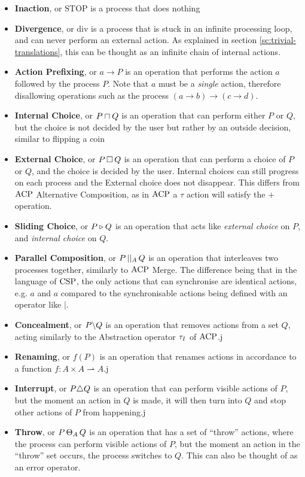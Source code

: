 \documentclass[../hons_project.tex]{subfiles}
\begin{document}
\begin{itemize}
    \item \textbf{Inaction}, or $\mathrm{STOP}$ is a process that does nothing
    \item \textbf{Divergence}, or $\mathrm{div}$ is a process that is stuck in an infinite processing loop, and can never perform an external action. As explained in section \ref{sc:trivial-translations}, this can be thought as an infinite chain of internal actions.
    \item \textbf{Action Prefixing}, or $a \to P$ is an operation that performs the action $a$ followed by the process $P$. Note that $a$ must be a \textit{single} action, therefore disallowing operations such as the process $(a \to b) \to (c \to d)$.
    \item \textbf{Internal Choice}, or $P \sqcap Q$ is an operation that can perform either $P$ or $Q$, but the choice is not decided by the user but rather by an outside decision, similar to flipping a coin
    \item \textbf{External Choice}, or $P \,\square\, Q$ is an operation that can perform a choice of $P$ or $Q$, and the choice is decided by the user. Internal choices can still progress on each process and the External choice does not disappear. This differs from $\mathrm{ACP}$ Alternative Composition, as in $\mathrm{ACP}$ a $\tau$ action will satisfy the $+$ operation.
    \item \textbf{Sliding Choice}, or $P \triangleright Q$ is an operation that acts like \textit{external choice} on $P$, and \textit{internal choice} on $Q$.
    \item \textbf{Parallel Composition}, or $P \,\vert\vert_{A}\, Q$ is an operation that interleaves two processes together, similarly to $\mathrm{ACP}$ Merge. The difference being that in the language of $\mathrm{CSP}$, the only actions that can synchronise are identical actions, e.g. $a$ and $a$ compared to the synchronisable actions being defined with an operator like $\mid$.
    \item \textbf{Concealment}, or $P \backslash Q$ is an operation that removes actions from a set $Q$, acting similarly to the Abstraction operator $\tau_{I}$ of $\mathrm{ACP}$.j
    \item \textbf{Renaming}, or $f(P)$ is an operation that renames actions in accordance to a function $f : A \times A \rightharpoonup A$.j
    \item \textbf{Interrupt}, or $P \triangle Q$ is an operation that can perform visible actions of $P$, but the moment an action in $Q$ is made, it will then turn into $Q$ and stop other actions of $P$ from happening.j
    \item \textbf{Throw}, or $P \,\Theta_{A}\, Q$ is an operation that has a set of ``throw'' actions, where the process can perform visible actions of $P$, but the moment an action in the ``throw'' set occurs, the process switches to $Q$. This can also be thought of as an error operator.
\end{itemize}
\end{document}
